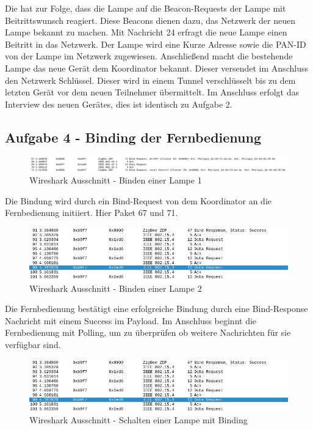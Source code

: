 Die hat zur Folge, dass die Lampe auf die Beacon-Requests der Lampe mit Beitrittswunsch reagiert. Diese Beacons dienen dazu, das Netzwerk der neuen Lampe bekannt zu machen.
Mit Nachricht 24 erfragt die neue Lampe einen Beitritt in das Netzwerk. Der Lampe wird eine Kurze Adresse sowie die PAN-ID von der Lampe im Netzwerk zugewiesen. Anschließend 
macht die bestehende Lampe das neue Gerät dem Koordinator bekannt. Dieser versendet im Anschluss den Netzwerk Schlüssel. Dieser wird in einem Tunnel verschlüsselt bis zu dem letzten
Gerät vor dem neuen Teilnehmer übermittelt. Im Anschluss erfolgt das Interview des neuen Gerätes, dies ist identisch zu Aufgabe 2.

\subsection{Aufgabe 4 - Binding der Fernbedienung}

\begin{figure}[H]
    \centering
    \includegraphics[width=1\textwidth]{media/lsg-4-1.png}
    \caption{Wireshark Ausschnitt - Binden einer Lampe 1}
\end{figure}

Die Bindung wird durch ein Bind-Request von dem Koordinator an die Fernbedienung initiiert. Hier Paket 67 und 71.

\begin{figure}[H]
    \centering
    \includegraphics[width=1\textwidth]{media/lsg-4-2.png}
    \caption{Wireshark Ausschnitt - Binden einer Lampe 2}
\end{figure}

Die Fernbedienung bestätigt eine erfolgreiche Bindung durch eine Bind-Response Nachricht mit einem \grqq Success\grqq{} im Payload.
Im Anschluss beginnt die Fernbedienung mit Polling, um zu überprüfen ob weitere Nachrichten für sie verfügbar sind.

\begin{figure}[H]
    \centering
    \includegraphics[width=1\textwidth]{media/lsg-4-2.png}
    \caption{Wireshark Ausschnitt - Schalten einer Lampe mit Binding}
\end{figure}

